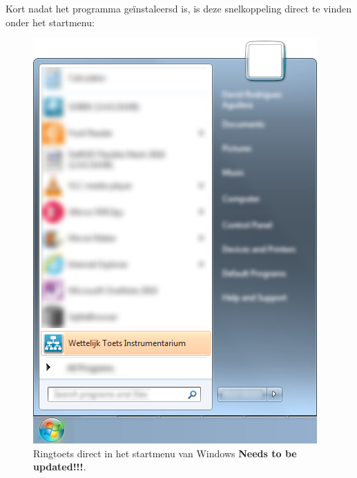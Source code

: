 Kort nadat het programma ge\"instaleersd is, is deze snelkoppeling direct te vinden onder het startmenu:


\begin{figure} [H]
	\centering
		\includegraphics{figures/chapter_installation/rtDirectlyinStartMenu}
	\caption{Ringtoets direct in het startmenu van Windows \color[rgb]{1,0,0} \textbf{Needs to be updated!!!}\color[rgb]{0,0,0}.}
	\label{fig:figinstall.3}
\end{figure}













